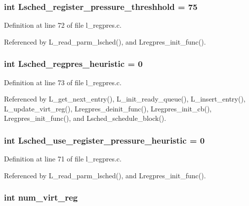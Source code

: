 \subsubsection{\setlength{\rightskip}{0pt plus 5cm}int \bf{Lsched\_\-register\_\-pressure\_\-threshhold} = 75}\label{l__regpres_8c_d6b0405973ba10a6f980c3dcc31abeb5}




Definition at line 72 of file l\_\-regpres.c.

Referenced by L\_\-read\_\-parm\_\-lsched(), and Lregpres\_\-init\_\-func().
\subsubsection{\setlength{\rightskip}{0pt plus 5cm}int \bf{Lsched\_\-regpres\_\-heuristic} = 0}\label{l__regpres_8c_b801097b81716757db39ca58936d99d8}




Definition at line 73 of file l\_\-regpres.c.

Referenced by L\_\-get\_\-next\_\-entry(), L\_\-init\_\-ready\_\-queue(), L\_\-insert\_\-entry(), L\_\-update\_\-virt\_\-reg(), Lregpres\_\-deinit\_\-func(), Lregpres\_\-init\_\-cb(), Lregpres\_\-init\_\-func(), and Lsched\_\-schedule\_\-block().
\subsubsection{\setlength{\rightskip}{0pt plus 5cm}int \bf{Lsched\_\-use\_\-register\_\-pressure\_\-heuristic} = 0}\label{l__regpres_8c_dcfe1fc65128905189f3a03d1983154d}




Definition at line 71 of file l\_\-regpres.c.

Referenced by L\_\-read\_\-parm\_\-lsched(), and Lregpres\_\-init\_\-func().
\subsubsection{\setlength{\rightskip}{0pt plus 5cm}int \bf{num\_\-virt\_\-reg}}\label{l__regpres_8c_29f2c6acf4cc9d4768a15fe331319db9}




